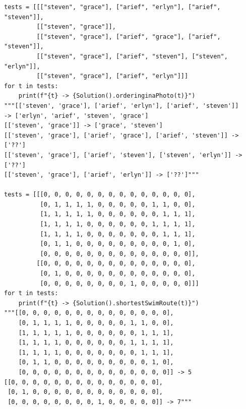 \documentclass[12pt]{article}
\begin{document}
\begin{verbatim}
tests = [[["steven", "grace"], ["arief", "erlyn"], ["arief", "steven"]],
         [["steven", "grace"]],
         [["steven", "grace"], ["arief", "grace"], ["arief", "steven"]],
         [["steven", "grace"], ["arief", "steven"], ["steven", "erlyn"]],
         [["steven", "grace"], ["arief", "erlyn"]]]
for t in tests:
    print(f"{t} -> {Solution().orderinginaPhoto(t)}")
"""[['steven', 'grace'], ['arief', 'erlyn'], ['arief', 'steven']]
-> ['erlyn', 'arief', 'steven', 'grace']
[['steven', 'grace']] -> ['grace', 'steven']
[['steven', 'grace'], ['arief', 'grace'], ['arief', 'steven']] -> ['??']
[['steven', 'grace'], ['arief', 'steven'], ['steven', 'erlyn']] -> ['??']
[['steven', 'grace'], ['arief', 'erlyn']] -> ['??']"""

tests = [[[0, 0, 0, 0, 0, 0, 0, 0, 0, 0, 0, 0, 0, 0],
          [0, 1, 1, 1, 1, 0, 0, 0, 0, 0, 1, 1, 0, 0],
          [1, 1, 1, 1, 1, 0, 0, 0, 0, 0, 0, 1, 1, 1],
          [1, 1, 1, 1, 0, 0, 0, 0, 0, 0, 1, 1, 1, 1],
          [1, 1, 1, 1, 0, 0, 0, 0, 0, 0, 0, 1, 1, 1],
          [0, 1, 1, 0, 0, 0, 0, 0, 0, 0, 0, 0, 1, 0],
          [0, 0, 0, 0, 0, 0, 0, 0, 0, 0, 0, 0, 0, 0]],
         [[0, 0, 0, 0, 0, 0, 0, 0, 0, 0, 0, 0, 0, 0],
          [0, 1, 0, 0, 0, 0, 0, 0, 0, 0, 0, 0, 0, 0],
          [0, 0, 0, 0, 0, 0, 0, 0, 1, 0, 0, 0, 0, 0]]]
for t in tests:
    print(f"{t} -> {Solution().shortestSwimRoute(t)}")
"""[[0, 0, 0, 0, 0, 0, 0, 0, 0, 0, 0, 0, 0, 0],
    [0, 1, 1, 1, 1, 0, 0, 0, 0, 0, 1, 1, 0, 0],
    [1, 1, 1, 1, 1, 0, 0, 0, 0, 0, 0, 1, 1, 1],
    [1, 1, 1, 1, 0, 0, 0, 0, 0, 0, 1, 1, 1, 1],
    [1, 1, 1, 1, 0, 0, 0, 0, 0, 0, 0, 1, 1, 1],
    [0, 1, 1, 0, 0, 0, 0, 0, 0, 0, 0, 0, 1, 0],
    [0, 0, 0, 0, 0, 0, 0, 0, 0, 0, 0, 0, 0, 0]] -> 5
[[0, 0, 0, 0, 0, 0, 0, 0, 0, 0, 0, 0, 0, 0],
 [0, 1, 0, 0, 0, 0, 0, 0, 0, 0, 0, 0, 0, 0],
 [0, 0, 0, 0, 0, 0, 0, 0, 1, 0, 0, 0, 0, 0]] -> 7"""
\end{verbatim}
\end{document}
